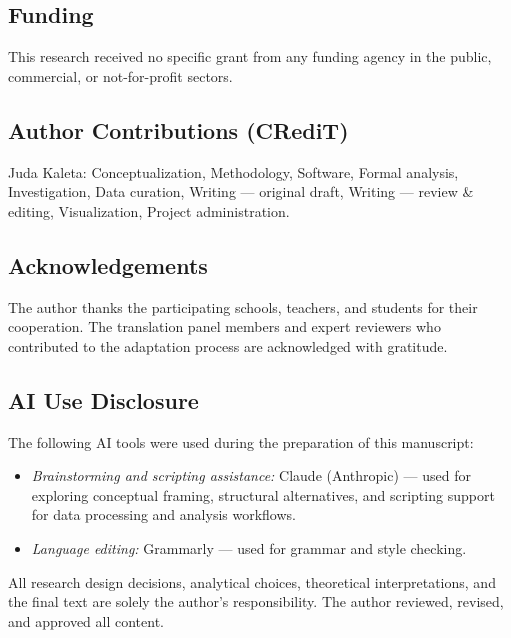 \documentclass[
  12pt,
]{article}
\providecommand{\tightlist}{%
  \setlength{\itemsep}{0pt}\setlength{\parskip}{0pt}}
\begin{document}
\hypertarget{funding}{%
\subsection{Funding}\label{funding}}

This research received no specific grant from any funding agency in the public, commercial, or not-for-profit sectors.

\hypertarget{author-contributions-credit}{%
\subsection{Author Contributions (CRediT)}\label{author-contributions-credit}}

Juda Kaleta: Conceptualization, Methodology, Software, Formal analysis, Investigation, Data curation, Writing --- original draft, Writing --- review \& editing, Visualization, Project administration.

\hypertarget{acknowledgements}{%
\subsection{Acknowledgements}\label{acknowledgements}}

The author thanks the participating schools, teachers, and students for their cooperation. The translation panel members and expert reviewers who contributed to the adaptation process are acknowledged with gratitude.

\hypertarget{ai-use-disclosure}{%
\subsection{AI Use Disclosure}\label{ai-use-disclosure}}

The following AI tools were used during the preparation of this manuscript:

\begin{itemize}
\tightlist
\item
  \emph{Brainstorming and scripting assistance:} Claude (Anthropic) ---
  used for exploring conceptual framing, structural alternatives, and
  scripting support for data processing and analysis workflows.
\item
  \emph{Language editing:} Grammarly --- used for grammar and style
  checking.
\end{itemize}

All research design decisions, analytical choices, theoretical interpretations, and the final text are solely the author's responsibility. The author reviewed, revised, and approved all content.
\end{document}
